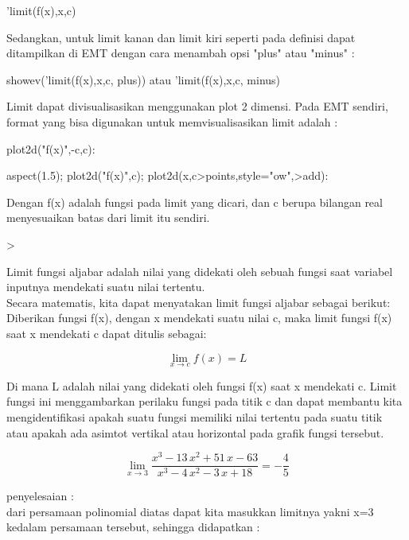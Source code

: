 \documentclass[a4paper,10pt]{article}
\begin{document}
\begin{eulernotebook}
\begin{eulercomment}
\begin{eulercomment}
\begin{eulercomment}
\begin{eulercomment}
\begin{eulercomment}
\begin{eulercomment}
\begin{eulercomment}
'limit(f(x),x,c)

Sedangkan, untuk limit kanan dan limit kiri seperti pada definisi
dapat ditampilkan di EMT dengan cara menambah opsi "plus" atau "minus"
:

\textdollar{}showev('limit(f(x),x,c, plus)) atau 'limit(f(x),x,c, minus)

Limit dapat divisualisasikan menggunakan plot 2 dimensi. Pada EMT
sendiri, format yang bisa digunakan untuk memvisualisasikan limit
adalah :

plot2d("f(x)",-c,c):

aspect(1.5); plot2d("f(x)",c); plot2d(x,c\textgreater{}points,style="ow",\textgreater{}add):

Dengan f(x) adalah fungsi pada limit yang dicari, dan c berupa
bilangan real menyesuaikan batas dari limit itu sendiri.
\end{eulercomment}
\begin{eulerprompt}
>               
\end{eulerprompt}
\begin{eulercomment}
Limit fungsi aljabar adalah nilai yang didekati oleh sebuah fungsi
saat variabel inputnya mendekati suatu nilai tertentu.\\
Secara matematis, kita dapat menyatakan limit fungsi aljabar sebagai
berikut:\\
Diberikan fungsi f(x), dengan x mendekati suatu nilai c, maka limit
fungsi f(x) saat x mendekati c dapat ditulis sebagai:

\end{eulercomment}
\begin{eulerformula}
\[
\lim_{x \to c} f(x) = L
\]
\end{eulerformula}
\begin{eulercomment}
Di mana L adalah nilai yang didekati oleh fungsi f(x) saat x mendekati
c. Limit fungsi ini menggambarkan perilaku fungsi pada titik c dan
dapat membantu kita mengidentifikasi apakah suatu fungsi memiliki
nilai tertentu pada suatu titik atau apakah ada asimtot vertikal atau
horizontal pada grafik fungsi tersebut.
\end{eulercomment}
\begin{eulerformula}
\[
\lim_{x\rightarrow 3}{\frac{x^3-13\,x^2+51\,x-63}{x^3-4\,x^2-3\,x+  18}}=-\frac{4}{5}
\]
\end{eulerformula}
\begin{eulercomment}
penyelesaian :\\
dari persamaan polinomial diatas dapat kita masukkan limitnya yakni
x=3 kedalam persamaan tersebut, sehingga didapatkan :


\end{eulercomment}
\end{eulercomment}
\end{eulercomment}
\end{eulercomment}
\end{eulercomment}
\end{eulercomment}
\end{eulercomment}
\end{eulernotebook}
\end{document}
